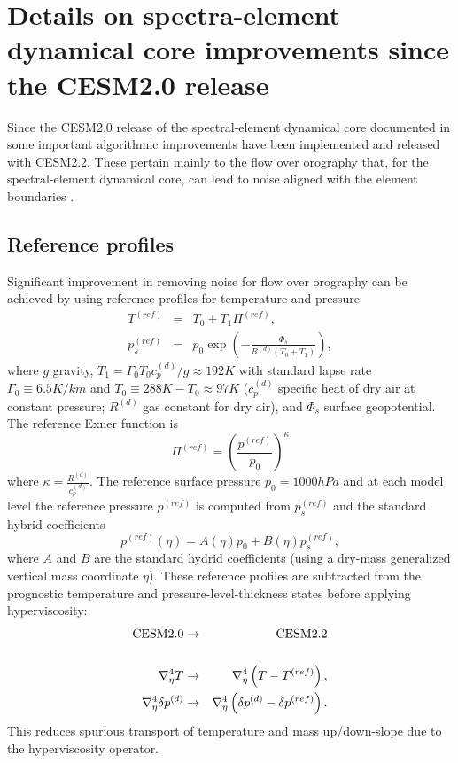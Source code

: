 \documentclass[draft]{agujournal2019}
\begin{document}
\section{Details on spectra-element dynamical core improvements since the CESM2.0 release}
Since the CESM2.0 release of the spectral-element dynamical core documented in  some important algorithmic improvements have been implemented and released with CESM2.2. These pertain mainly to the flow over orography that, for the spectral-element dynamical core, can lead to noise aligned with the element boundaries \cite{HL2018MWR}.
\subsection{Reference profiles}
Significant improvement in removing noise for flow over orography can be achieved by using reference profiles for temperature and pressure
\begin{eqnarray}
  T^{(ref)}&=&T_0+T_1 \Pi^{(ref)},\\
  p_s^{(ref)}&=&p_0\exp{\left(-\frac{\Phi_s}{R^{(d)}(T_0+T_1)}\right)},
\end{eqnarray}
{\color{blue}{Mark - Note: new definition of T0 means this equation should also be changed}} \cite{SJ1991QJRMS} where $g$ gravity, $T_1=\Gamma_0 T_0 c_p^{(d)}/g\approx 192K$ with standard lapse rate $\Gamma_0\equiv 6.5K/km$ and $T_0\equiv 288K-T_0\approx 97K$ ($c_p^{(d)}$ specific heat of dry air at constant pressure; $R^{(d)}$ gas constant for dry air), and $\Phi_s$ surface geopotential. The reference Exner function is
\begin{equation}
   \Pi^{(ref)}=\left( \frac{p^{(ref)}}{p_0}\right)^{\kappa}
\end{equation}
where $\kappa=\frac{R^{(d)}}{c_p^{(d)}}$. The reference surface pressure $p_0=1000hPa$ and at each model level the reference pressure $p^{(ref)}$ is computed from $p_s^{(ref)}$ and the standard hybrid coefficients
\begin{equation}
    p^{(ref)}(\eta) = A(\eta)p_0+B(\eta)p_s^{(ref)},
\end{equation}
where $A$ and $B$ are the standard hydrid coefficients (using a dry-mass generalized vertical mass coordinate $\eta$). These reference profiles are subtracted from the prognostic temperature and pressure-level-thickness states before applying hyperviscosity:
\begin{eqnarray}
   \hbox{CESM2.0}&\rightarrow&\hbox{CESM2.2}\\
   && \\
  \nabla^4_\eta T &\rightarrow& \nabla^4_\eta \left(T-T^{(ref)}\right),\label{eq:hyperT}\\ 
    \nabla^4_\eta \delta p^{(d)} &\rightarrow& \nabla^4_\eta \left(\delta p^{(d)}-\delta p^{(ref)}\right).\label{eq:hyperDP}
\end{eqnarray}
This reduces spurious transport of temperature and mass up/down-slope due to the hyperviscosity operator. 
\end{document}

